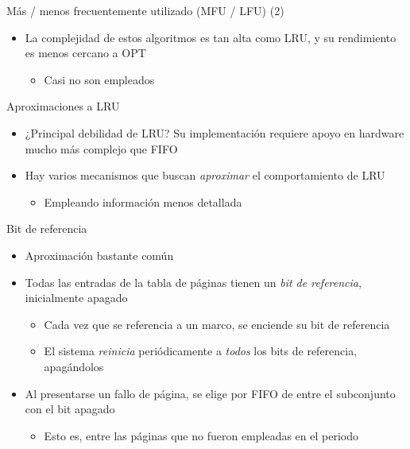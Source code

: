 \documentclass[presentation]{beamer}
\begin{document}
\begin{frame}[label={sec:orgf15eb6d}]{Más / menos frecuentemente utilizado (MFU / LFU) (2)}
\begin{itemize}
\item La complejidad de estos algoritmos es tan alta como LRU, y su
rendimiento es menos cercano a OPT
\begin{itemize}
\item Casi no son empleados
\end{itemize}
\end{itemize}
\end{frame}

\begin{frame}[label={sec:orge3889e6}]{Aproximaciones a LRU}
\begin{itemize}
\item ¿Principal debilidad de LRU? Su implementación requiere apoyo en
hardware mucho más complejo que FIFO
\item Hay varios mecanismos que buscan \emph{aproximar} el comportamiento de
LRU
\begin{itemize}
\item Empleando información menos detallada
\end{itemize}
\end{itemize}
\end{frame}

\begin{frame}[label={sec:org8fdb433}]{Bit de referencia}
\begin{itemize}
\item Aproximación bastante común
\item Todas las entradas de la tabla de páginas tienen un \emph{bit de
referencia}, inicialmente apagado
\begin{itemize}
\item Cada vez que se referencia a un marco, se enciende su bit de
referencia
\item El sistema \emph{reinicia} periódicamente a \emph{todos} los bits de
referencia, apagándolos
\end{itemize}
\item Al presentarse un fallo de página, se elige por FIFO de entre el
subconjunto con el bit apagado
\begin{itemize}
\item Esto es, entre las páginas que no fueron empleadas en el periodo
\end{itemize}
\end{itemize}
\end{frame}
\end{document}
